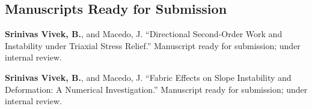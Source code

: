 \documentclass[10pt,letterpaper]{article}
\newcommand{\pub}[2]{%
    \item \hypertarget{pub:#1}{}#2
}
\begin{document}
\subsection{Manuscripts Ready for Submission}
\begin{enumerate}[resume, label={[\arabic*]}, leftmargin=*, itemsep=0pt]

\pub{8}{\textbf{Srinivas Vivek, B.}, and Macedo, J. ``Directional Second-Order Work and Instability under Triaxial Stress Relief.'' Manuscript ready for submission; under internal review.}

\pub{9}{\textbf{Srinivas Vivek, B.}, and Macedo, J. ``Fabric Effects on Slope Instability and Deformation:
A Numerical Investigation.'' Manuscript ready for submission; under internal review.}

\end{enumerate}

\end{document}
